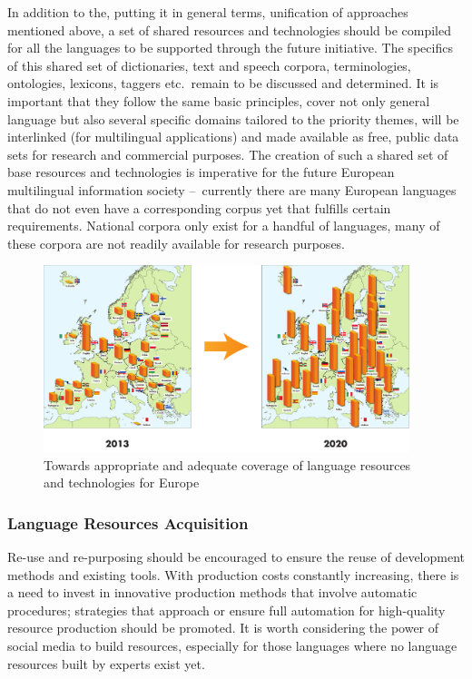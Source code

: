\documentclass[10pt, plain]{../../metanetpaper}
\begin{document}
\begin{multicols}{2}
In addition to the, putting it in general terms, unification of approaches mentioned above, a set of shared resources and technologies should be compiled for all the languages to be supported through the future initiative. The specifics of this shared set of dictionaries, text and speech corpora, terminologies, ontologies, lexicons, taggers etc.~remain to be discussed and determined. It is important that they follow the same basic principles, cover not only general language but also several specific domains tailored to the priority themes, will be interlinked (for multilingual applications) and made available as free, public data sets for research and commercial purposes. The creation of such a shared set of base resources and technologies is imperative for the future European multilingual information society --~currently there are many European languages that do not even have a corresponding corpus yet that fulfills certain requirements. National corpora only exist for a handful of languages, many of these corpora are not readily available for research purposes. 

\begin{figure}[htb]
  \center
  \includegraphics[width=0.95\textwidth]{../_media/europeImproveLT.pdf}
  \caption{Towards appropriate and adequate coverage of language resources and technologies for Europe}
  \label{fig:lr-lt-coverage}
\end{figure}

\subsubsection{Language Resources Acquisition}
\label{sec:lang-reso-acqu}

Re-use and re-purposing should be encouraged to ensure the reuse of development methods and existing tools. With production costs constantly increasing, there is a need to invest in innovative production methods that involve automatic procedures; strategies that approach or ensure full automation for high-quality resource production should be promoted. It is worth considering the power of social media to build resources, especially for those languages where no language resources built by experts exist yet.


\end{multicols}
\end{document}
